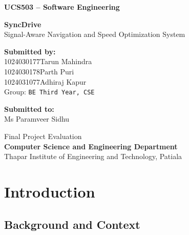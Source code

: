 \documentclass[12pt,a4paper]{report}
\begin{document}
\begin{titlepage}
\thispagestyle{empty}
\centering
\vspace*{2.2cm}

{\large\textbf{UCS503 -- Software Engineering}}

\vspace{1.6cm}

{\Huge\textbf{SyncDrive}}\\[0.45cm]
{\large Signal-Aware Navigation and Speed Optimization System}

\vspace{3.2cm}

\textbf{Submitted by:}\\[0.35cm]
{\normalsize
1024030177\quad Tarun Mahindra\\[2pt]
1024030178\quad Parth Puri\\[2pt]
1024031077\quad Adhiraj Kapur\\[8pt]
}
Group: \texttt{BE Third Year, CSE}

\vspace{2.8cm}

\textbf{Submitted to:}\\[0.35cm]
Ms Paramveer Sidhu

\vspace{2.8cm}

Final Project Evaluation\\[4pt]
{\large\textbf{Computer Science and Engineering Department}}\\[4pt]
Thapar Institute of Engineering and Technology, Patiala

\end{titlepage}

\setcounter{page}{1}
\tableofcontents
\newpage

\chapter{Introduction}

\section{Background and Context}
\end{document}
